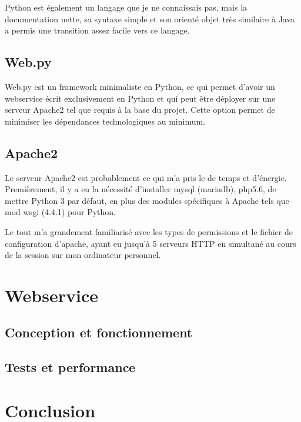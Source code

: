 \documentclass[a4paper,12pt,titlepage]{article}
\begin{document}
Python est également un langage que je ne connaissais pas, mais la documentation nette, sa syntaxe simple et son orienté objet très similaire à Java a permis une transition assez facile vers ce langage. 
\subsection{Web.py}
Web.py est un framework minimaliste en Python, ce qui permet d'avoir un webservice écrit exclusivement en Python et qui peut être déployer sur une serveur Apache2 tel que requis à la base du projet. Cette option permet de minimiser les dépendances technologiques au minimum.
\subsection{Apache2}
Le serveur Apache2 est probablement ce qui m'a pris le de temps et d'énergie. Premièrement, il y a eu la nécessité d'installer mysql (mariadb), php5.6, de mettre Python 3 par défaut, en plus des modules spécifiques à Apache tels que mod$\_$wsgi (4.4.1) pour Python. \newline

Le tout m'a grandement familiarisé avec les types de permissions et le fichier de configuration d'apache, ayant eu jusqu'à 5 serveurs HTTP en simultané au cours de la session sur mon ordinateur personnel. 
\section{Webservice}
\subsection{Conception et fonctionnement}

\subsection{Tests et performance}

\section{Conclusion}
\end{document}
